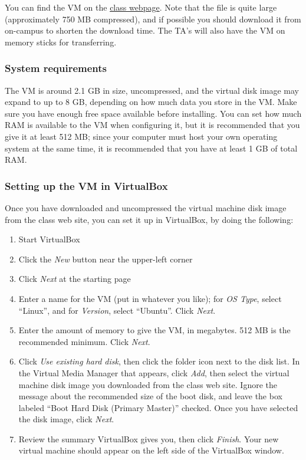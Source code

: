 \documentclass[letterpaper,10pt,english]{sphinxmanual}
\begin{document}
You can find the VM on the \href{http://faculty.washington.edu/rjl/classes/am583s2013/}{class
webpage}.
Note that the file is quite
large (approximately 750 MB compressed), and if possible you should
download it from on-campus to shorten the download time.  The TA's will also
have the VM on memory sticks for transferring.


\subsubsection{System requirements}
\label{2013/vm:system-requirements}
The VM is around 2.1 GB in size, uncompressed, and the virtual disk
image may expand to up to 8 GB, depending on how much data you store
in the VM.  Make sure you have enough free space available before
installing.  You can set how much RAM is available to the VM when
configuring it, but it is recommended that you give it at least 512
MB; since your computer must host your own operating system at the
same time, it is recommended that you have at least 1 GB of total RAM.


\subsubsection{Setting up the VM in VirtualBox}
\label{2013/vm:setting-up-the-vm-in-virtualbox}
Once you have downloaded and uncompressed the virtual machine disk
image from the class web site, you can set it up in VirtualBox, by
doing the following:
\begin{enumerate}
\item {} 
Start VirtualBox

\item {} 
Click the \emph{New} button near the upper-left corner

\item {} 
Click \emph{Next} at the starting page

\item {} 
Enter a name for the VM (put in whatever you like); for \emph{OS Type},
select ``Linux'', and for \emph{Version}, select ``Ubuntu''.  Click \emph{Next}.

\item {} 
Enter the amount of memory to give the VM, in megabytes.
512 MB is the recommended minimum.  Click \emph{Next}.

\item {} 
Click \emph{Use existing hard disk}, then click the folder icon next to
the disk list.  In the Virtual Media Manager that appears, click
\emph{Add}, then select the virtual machine disk image you downloaded
from the class web site.  Ignore the message about the recommended
size of the boot disk, and leave the box labeled ``Boot Hard Disk
(Primary Master)'' checked.  Once you have selected the disk image,
click \emph{Next}.

\item {} 
Review the summary VirtualBox gives you, then click \emph{Finish}.  Your
new virtual machine should appear on the left side of the VirtualBox
window.

\end{enumerate}
\end{document}

